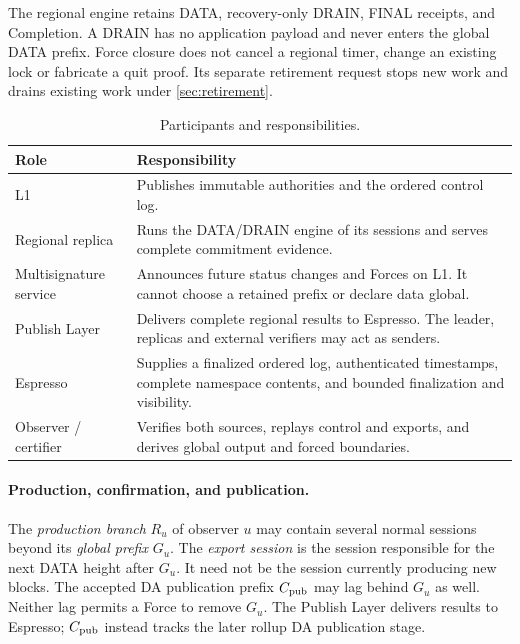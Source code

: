 \documentclass[11pt,a4paper]{article}
\newcommand{\defterm}[1]{\textcolor{rrBlue}{\textit{#1}}}
\begin{document}
The regional engine retains DATA, recovery-only DRAIN, FINAL receipts,
and Completion. A DRAIN has no application payload and never enters the
global DATA prefix. Force closure does not cancel a regional timer,
change an existing lock or fabricate a quit proof. Its separate retirement
request stops new work and drains existing work under \cref{sec:retirement}.

\begin{table}[htbp]\centering\small
\caption{Participants and responsibilities.}\label{tab:roles}
\begin{tabularx}{\linewidth}{@{}>{\raggedright\arraybackslash}p{.19\linewidth}Y@{}}\toprule
Role & Responsibility\\\midrule
L1 & Publishes immutable authorities and the ordered control log.\\
Regional replica & Runs the DATA/DRAIN engine of its sessions and
serves complete commitment evidence.\\
Multisignature service & Announces future status changes and Forces
on L1. It cannot choose a retained prefix or declare data global.\\
Publish Layer & Delivers complete regional results to Espresso. The
leader, replicas and external verifiers may act as senders.\\
Espresso & Supplies a finalized ordered log, authenticated timestamps,
complete namespace contents, and bounded finalization and visibility.\\
Observer / certifier & Verifies both sources, replays control and
exports, and derives global output and forced boundaries.\\
\bottomrule
\end{tabularx}
\end{table}

\paragraph{Production, confirmation, and publication.}
The \defterm{production branch} $R_u$ of observer $u$ may contain
several normal sessions beyond its \defterm{global prefix} $G_u$.
The \defterm{export session} is the session responsible for the next
DATA height after $G_u$. It need not be the session currently producing
new blocks. The accepted DA publication prefix $C_{\rm pub}$ may lag
behind $G_u$ as well. Neither lag permits a Force to remove $G_u$.
The Publish Layer delivers results to Espresso; $C_{\rm pub}$ instead
tracks the later rollup DA publication stage.
\end{document}
